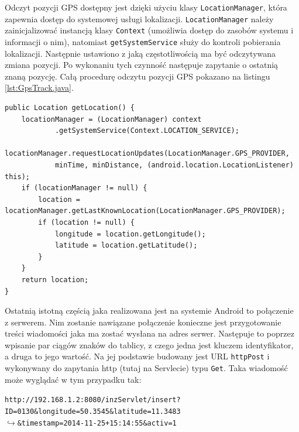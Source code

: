 \documentclass[eng,printmode,oneside]{mgr}
\begin{document}
Odczyt pozycji GPS dostępny jest dzięki użyciu klasy \texttt{LocationManager},
która zapewnia dostęp do systemowej usługi lokalizacji. \texttt{LocationManager}
należy zainicjalizować instancją klasy \texttt{Context} (umożliwia dostęp do
zasobów systemu i informacji o nim), natomiast \texttt{getSystemService} służy
do kontroli pobierania lokalizacji. Następnie ustawiono z jaką częstotliwością
ma być odczytywana zmiana pozycji. Po wykonaniu tych czynność następuje
zapytanie o ostatnią znaną pozycję. Całą procedurę odczytu pozycji GPS pokazano
na listingu \ref{lst:GpsTrack.java}.

 \begin{lstlisting}[caption=Pobieranie lokalizacji
kuriera metoda getLocation() z klasy GpsTrack,label=lst:GpsTrack.java]
public Location getLocation() {
	locationManager = (LocationManager) context
			.getSystemService(Context.LOCATION_SERVICE);
	locationManager.requestLocationUpdates(LocationManager.GPS_PROVIDER,
			minTime, minDistance, (android.location.LocationListener) this);
	if (locationManager != null) {
		location = locationManager.getLastKnownLocation(LocationManager.GPS_PROVIDER);
		if (location != null) {
			longitude = location.getLongitude();
			latitude = location.getLatitude();
		}
	}
	return location;
}
\end{lstlisting}

Ostatnią istotną częścią jaka realizowana jest na systemie Android to połączenie
z serwerem. Nim zostanie nawiązane połączenie konieczne jest przygotowanie
treści wiadomości jaka ma zostać wysłana na adres serwer. Następuje to poprzez
wpisanie par ciągów znaków do tablicy, z czego jedna jest kluczem identyfikator,
a druga to jego wartość. Na jej podstawie budowany jest URL \texttt{httpPost}
i wykonywany do zapytania http (tutaj na Servlecie) typu \texttt{Get}. Taka
wiadomość może wyglądać w tym przypadku tak:

\begin{flushright}
\texttt{http://192.168.1.2:8080/inzServlet/insert?ID=0130\&longitude=50.3545\&latitude=11.3483
\\$\hookrightarrow$\&timestamp=2014-11-25+15:14:55\&activ=1}
\end{flushright}
\end{document}

